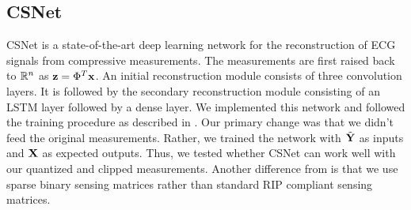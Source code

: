 \subsection{CSNet}

CSNet \cite{zhang2021csnet} is a state-of-the-art deep learning network
for the reconstruction of ECG signals from compressive
measurements. The measurements are first raised back
to $\mathbb{R}^n$ as $\mathbf{z} = \Phi^T \mathbf{x}$. 
An initial reconstruction module consists of three convolution
layers. It is followed by the secondary reconstruction module
consisting of an LSTM layer followed by a dense layer.
We implemented this network and followed the training procedure
as described in \cite{zhang2021csnet}.
Our primary change was that we didn't feed the original
measurements.
Rather, we trained the network with $\tilde{\mathbf{Y}}$
as inputs and $\mathbf{X}$ as expected outputs.
Thus, we tested whether CSNet can work well with our
quantized and clipped measurements. 
Another difference from \cite{zhang2021csnet} is that
we use sparse binary sensing matrices rather than standard RIP compliant
sensing matrices.

